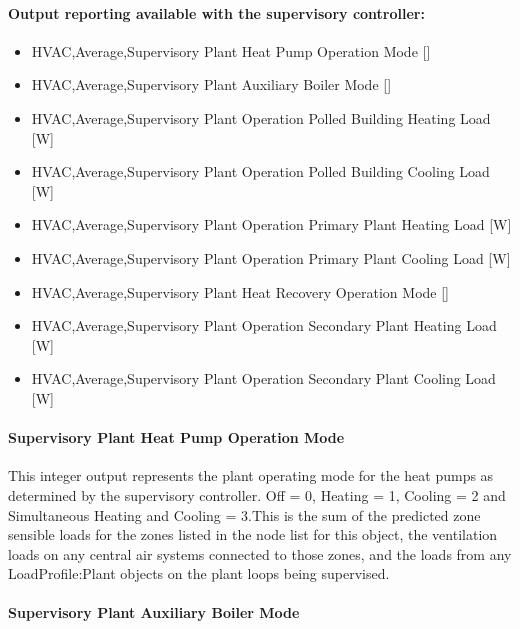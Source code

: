 \paragraph{Output reporting available with the supervisory controller:}\label{operation-scheme-heating-outputs-description}

\begin{itemize}
    \item
    HVAC,Average,Supervisory Plant Heat Pump Operation Mode  {[}{]}
    \item
    HVAC,Average,Supervisory Plant Auxiliary Boiler Mode  {[}{]}
    \item
    HVAC,Average,Supervisory Plant Operation Polled Building Heating Load  {[}W{]}
    \item
    HVAC,Average,Supervisory Plant Operation Polled Building Cooling Load  {[}W{]}
    \item
    HVAC,Average,Supervisory Plant Operation Primary Plant Heating Load  {[}W{]}
    \item
    HVAC,Average,Supervisory Plant Operation Primary Plant Cooling Load  {[}W{]}
    \item
    HVAC,Average,Supervisory Plant Heat Recovery Operation Mode  {[}{]}
    \item
    HVAC,Average,Supervisory Plant Operation Secondary Plant Heating Load  {[}W{]}
    \item
    HVAC,Average,Supervisory Plant Operation Secondary Plant Cooling Load  {[}W{]}
\end{itemize}

\paragraph{Supervisory Plant Heat Pump Operation Mode}\label{operation-scheme-outputs-supervisory-plant-operation-mode}

This integer output represents the plant operating mode for the heat pumps as determined by the supervisory controller. Off = 0, Heating = 1, Cooling = 2 and Simultaneous Heating and Cooling = 3.This is the sum of the predicted zone sensible loads for the zones listed in the node list for this object, the ventilation loads on any central air systems connected to those zones, and the loads from any LoadProfile:Plant objects on the plant loops being supervised.



\paragraph{Supervisory Plant Auxiliary Boiler Mode}\label{operation-scheme-outputs-boiler-operation-mode}

